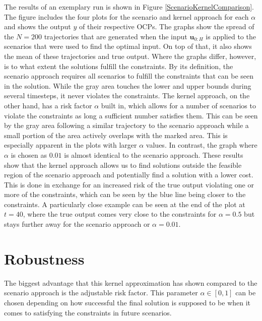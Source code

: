 The results of an exemplary run is shown in Figure \ref{ScenarioKernelComparison}. The figure includes the four plots for the scenario and kernel approach for each $\alpha$ and shows the output $y$ of their respective OCPs. The graphs show the spread of the $N = 200$ trajectories that are generated when the input $\boldsymbol{u}_{0:H}$ is applied to the scenarios that were used to find the optimal input. On top of that, it also shows the mean of these trajectories and true output. Where the graphs differ, however, is to what extent the solutions fulfill the constraints. By its definition, the scenario approach requires all scenarios to fulfill the constraints that can be seen in the solution. While the gray area touches the lower and upper bounds during several timesteps, it never violates the constraints. The kernel approach, on the other hand, has a risk factor $\alpha$ built in, which allows for a number of scenarios to violate the constraints as long a sufficient number satisfies them. This can be seen by the gray area following a similar trajectory to the scenario approach while a small portion of the area actively overlaps with the marked area. This is especially apparent in the plots with larger $\alpha$ values. In contrast, the graph where $\alpha$ is chosen as $0.01$ is almost identical to the scenario approach. These results show that the kernel approach allows us to find solutions outside the feasible region of the scenario approach and potentially find a solution with a lower cost. This is done in exchange for an increased risk of the true output violating one or more of the constraints, which can be seen by the blue line being closer to the constraints. A particularly close example can be seen at the end of the plot at $t = 40$, where the true output comes very close to the constraints for $\alpha = 0.5$ but stays further away for the scenario approach or $\alpha = 0.01$.




\section{Robustness} \label{performance guarantees}

The biggest advantage that this kernel approximation has shown compared to the scenario approach is the adjustable risk factor. This parameter $\alpha \in [0, 1]$ can be chosen depending on how successful the final solution is supposed to be when it comes to satisfying the constraints in future scenarios. 

